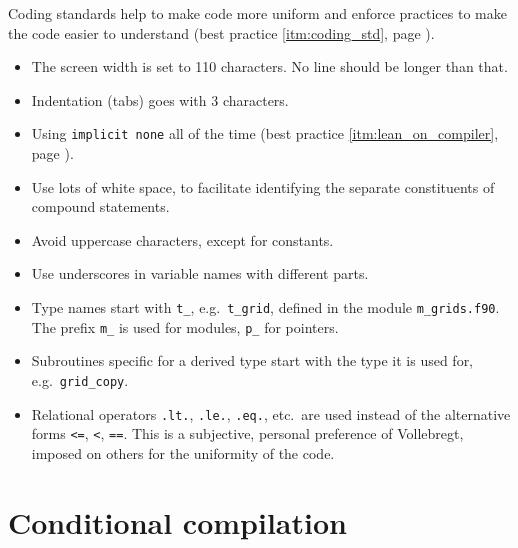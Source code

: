 \documentclass[12pt]{report}
\begin{document}
Coding standards help to make code more uniform and enforce practices to
make the code easier to understand (best practice \ref{itm:coding_std},
page \pageref{itm:coding_std}).
\begin{itemize}
\item The screen width is set to 110 characters. No line should be longer
        than that.
\item Indentation (tabs) goes with 3 characters.
\item Using {\tt implicit none} all of the time (best practice
        \ref{itm:lean_on_compiler}, page \pageref{itm:lean_on_compiler}).
\item Use lots of white space, to facilitate identifying the separate
        constituents of compound statements.
\item Avoid uppercase characters, except for constants.
\item Use underscores in variable names with different parts.
\item Type names start with {\tt t\_}, e.g.\ {\tt t\_grid}, defined in the
        module {\tt m\_grids.f90}. The prefix {\tt m\_} is used for
        modules, {\tt p\_} for pointers.
\item Subroutines specific for a derived type start with the type it is
        used for, e.g.\ {\tt grid\_copy}.
\item Relational operators {\tt .lt.}, {\tt .le.}, {\tt .eq.}, etc.\ are
        used instead of the alternative forms {\tt <=}, {\tt <}, {\tt ==}.
        This is a subjective, personal preference of Vollebregt, imposed on
        others for the uniformity of the code.
\end{itemize}

\section{Conditional compilation}
\end{document}
